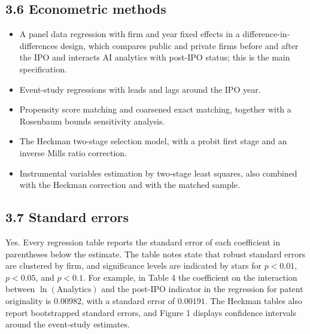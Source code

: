 \documentclass{HW} %
\begin{document}
\subsection*{3.6 Econometric methods}
\begin{itemize}
\item A panel data regression with firm and year fixed effects in a difference-in-differences design, which compares public and private firms before and after the IPO and interacts AI analytics with post-IPO status; this is the main specification.
\item Event-study regressions with leads and lags around the IPO year.
\item Propensity score matching and coarsened exact matching, together with a Rosenbaum bounds sensitivity analysis.
\item The Heckman two-stage selection model, with a probit first stage and an inverse Mills ratio correction.
\item Instrumental variables estimation by two-stage least squares, also combined with the Heckman correction and with the matched sample.
\end{itemize}

\subsection*{3.7 Standard errors}
Yes. Every regression table reports the standard error of each coefficient in parentheses below the estimate. The table notes state that robust standard errors are clustered by firm, and significance levels are indicated by stars for $p < 0.01$, $p < 0.05$, and $p < 0.1$. For example, in Table 4 the coefficient on the interaction between $\ln(\text{Analytics})$ and the post-IPO indicator in the regression for patent originality is $0.00982$, with a standard error of $0.00191$. The Heckman tables also report bootstrapped standard errors, and Figure 1 displays confidence intervals around the event-study estimates.
\end{document}
